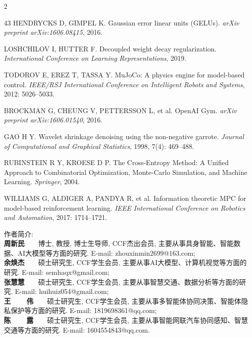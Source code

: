 \begin{multicols}{2}
{\begin{thebibliography}{43}
HENDRYCKS D, GIMPEL K. Gaussian error linear units (GELUs). {\it arXiv preprint arXiv:1606.08415}, 2016.

LOSHCHILOV I, HUTTER F. Decoupled weight decay regularization. {\it International Conference on Learning Representations}, 2019.

TODOROV E, EREZ T, TASSA Y. MuJoCo: A physics engine for model-based control. {\it IEEE/RSJ International Conference on Intelligent Robots and Systems}, 2012: 5026--5033.

BROCKMAN G, CHEUNG V, PETTERSSON L, et al. OpenAI Gym. {\it arXiv preprint arXiv:1606.01540}, 2016.

GAO H Y. Wavelet shrinkage denoising using the non-negative garrote. {\it Journal of Computational and Graphical Statistics}, 1998, 7(4): 469--488.

RUBINSTEIN R Y, KROESE D P. The Cross-Entropy Method: A Unified Approach to Combinatorial Optimization, Monte-Carlo Simulation, and Machine Learning. {\it Springer}, 2004.

WILLIAMS G, ALDIGER A, PANDYA R, et al. Information theoretic MPC for model-based reinforcement learning. {\it IEEE International Conference on Robotics and Automation}, 2017: 1714--1721.

\end{thebibliography}}

 \vskip 7pt
\noindent
{ 作者简介:}\\
 {\scriptsize
\indent \textbf{周新民}~~~~博士, 教授, 博士生导师, CCF杰出会员, 主要从事具身智能、智能数据、AI大模型等方面的研究. E-mail: \mbox{zhouxinmin2699@163.com};\\
\indent \textbf{余焕杰}~~~~硕士研究生, CCF学生会员, 主要从事AI大模型、计算机视觉等方面的研究. E-mail: \mbox{semhaqx@gmail.com};\\
\indent \textbf{张慧慧}~~~~硕士研究生, CCF学生会员, 主要从事智慧交通、数据分析等方面的研究. E-mail: \mbox{huihuiz054@gmail.com};\\
\indent \textbf{王~~~~伟}~~~~硕士研究生, CCF学生会员, 主要从事多智能体协同决策、智能体隐私保护等方面的研究. E-mail: \mbox{1819698361@qq.com};\\
\indent \textbf{陈~~~~露}~~~~硕士研究生, CCF学生会员, 主要从事智能网联汽车协同感知、智慧交通等方面的研究. E-mail: \mbox{1604554843@qq.com}.}
\end{multicols}

